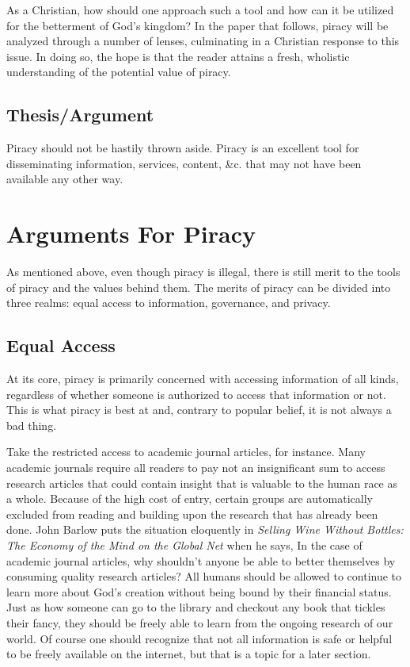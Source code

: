 \documentclass[onecolumn, 12pt]{article}
\begin{document}
As a Christian, how should one approach such a tool and how can it be utilized for the
betterment of God's kingdom? In the paper that follows, piracy will be analyzed through a
number of lenses, culminating in a Christian response to this issue. In doing so, the hope
is that the reader attains a fresh, wholistic understanding of the potential value of
piracy.

\subsection{Thesis/Argument}

Piracy should not be hastily thrown aside.
Piracy is an excellent tool for disseminating information, services, content,
\&c. that may not have been available any other way.

\section{Arguments For Piracy}
As mentioned above, even though piracy is illegal, there is still merit to the tools of
piracy and the values behind them. The merits of piracy can be divided into three realms:
equal access to information, governance, and privacy. 
\subsection{Equal Access}
At its core, piracy is primarily concerned with accessing information of all kinds,
regardless of whether someone is authorized to access that information or not. This is
what piracy is best at and, contrary to popular belief, it is not always a bad thing. 

Take the restricted access to academic journal articles, for instance. Many academic
journals require all readers to pay not an insignificant sum to access research articles
that could contain insight that is valuable to the human race as a whole. Because of the
high cost of entry, certain groups are automatically excluded from reading and building
upon the research that has already been done. John Barlow puts the situation eloquently in
\textit{Selling Wine Without Bottles: The Economy of the Mind on the Global Net} when he
says,  In the case of academic journal articles, why shouldn't anyone be
able to better themselves by consuming quality research articles? All humans should be
allowed to continue to learn more about God's creation without being bound by their
financial status. Just as how someone can go to the library and checkout any book that
tickles their fancy, they should be freely able to learn from the ongoing research of our
world. Of course one should recognize that not all information is safe or helpful to be
freely available on the internet, but that is a topic for a later section.
\end{document}
